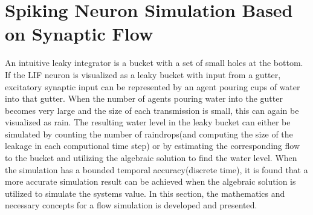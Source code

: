 
\section{Spiking Neuron Simulation Based on Synaptic Flow}
	\label{secDevelopmentOfTheNovelANNmodel}
	An intuitive leaky integrator is a bucket with a set of small holes at the bottom.
	If the LIF neuron is visualized as a leaky bucket with input from a gutter, excitatory synaptic input can be represented by an agent pouring cups of water into that gutter.
	When the number of agents pouring water into the gutter becomes very large and the size of each transmission is small, this can again be visualized as rain.
	The resulting water level in the leaky bucket can either be simulated by counting the number of raindrops(and computing the size of the leakage in each computional time step)
	or by estimating the corresponding flow to the bucket and utilizing the algebraic solution to find the water level.
	When the simulation has a bounded temporal accuracy(discrete time), it is found that a more accurate simulation result can be achieved when the algebraic solution is utilized to simulate the systems value.
	In this section, the mathematics and necessary concepts for a flow simulation is developed and presented.




